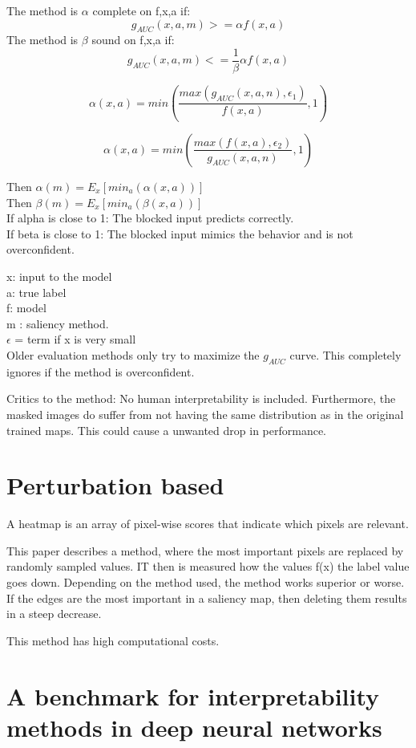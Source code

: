The method is $\alpha$ complete on f,x,a if:
$$ g_{AUC} (x,a,m) >= \alpha f(x,a)$$
The method is $\beta$ sound on f,x,a if:
$$ g_{AUC} (x,a,m) <= \frac{1}{\beta}\alpha f(x,a)$$

$$\alpha(x,a) = min(\frac{max(g_{AUC}(x,a,n),\epsilon_1)}{f(x,a)},1)$$

$$\alpha(x,a)=min(\frac{max(f(x,a),\epsilon_2)}{g_{AUC}(x,a,n)},1)$$

Then $\alpha(m) = E_x[min_a(\alpha(x,a))]$\\
Then $\beta(m) = E_x[min_a(\beta(x,a))]$\\

If alpha is close to 1: The blocked input predicts correctly. \\ If beta is close to 1: The blocked input mimics the behavior and is not overconfident.

x: input to the model \\
a: true label \\
f: model\\
m : saliency method.\\
$\epsilon$ = term if x is very small\\

Older evaluation methods only try to maximize the $g_{AUC}$ curve. This completely ignores if the method is overconfident.


Critics to the method: No human interpretability is included. Furthermore, the masked images do suffer from not having the same distribution as in the original trained maps. This could cause a unwanted drop in performance.

\section{Perturbation based \cite{7552539}}

A heatmap is an array of pixel-wise scores that indicate which pixels are relevant.

This paper describes a method, where the most important pixels are replaced by randomly sampled values. IT then is measured how the values f(x) the label value goes down. Depending on the method used, the method works superior or worse. If the edges are the most important in a saliency map, then deleting them results in a steep decrease.

This method has high computational costs.

\section{A benchmark for interpretability methods in deep neural networks \cite{hooker2019benchmark}}

